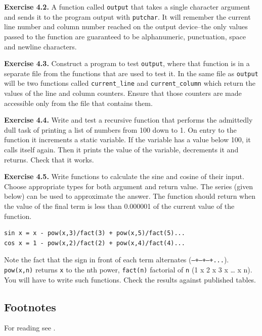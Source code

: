   \textbf{Exercise 4.2.} A function called \texttt{output} that takes a
   single character argument and sends it to the program output with
   \texttt{putchar}. It will remember the current line number and column
   number reached on the output device--the only values passed to the
   function are guaranteed to be alphanumeric, punctuation, space and
   newline characters.


  \textbf{Exercise 4.3.} Construct a program to test \texttt{output}, where
   that function is in a separate file from the functions that are used to
   test it. In the same file as \texttt{output} will be two functions
   called \texttt{current\_line} and \texttt{current\_column} which
   return the values of the line and column counters. Ensure that those
   counters are made accessible only from the file that contains
   them.


  \textbf{Exercise 4.4.} Write and test a recursive function that performs the
   admittedly dull task of printing a list of numbers from 100 down to 1. On
   entry to the function it increments a static variable. If the variable
   has a value below 100, it calls itself again. Then it prints the value of
   the variable, decrements it and returns. Check that it works.


  \textbf{Exercise 4.5.} Write functions to calculate the sine and cosine of their input.
    Choose appropriate types for both argument and return value. The series
    (given below) can be used to approximate the answer. The function should
    return when the value of the final term is less than 0.000001 of the
    current value of the function.

\begin{Verbatim}
sin x = x - pow(x,3)/fact(3) + pow(x,5)/fact(5)...
cos x = 1 - pow(x,2)/fact(2) + pow(x,4)/fact(4)...
\end{Verbatim}
Note the fact that the sign in front of each term alternates
    (\texttt{--+--+--+...}). \texttt{pow(x,n)} returns
    \texttt{x} to the nth power, \texttt{fact(n)}
    factorial of \texttt{n} (1 x 2 x 3 x \ldots 
    x n). You will have to write such functions. Check the
    results against published tables.

    \subsection{Footnotes}
    For reading see \cite{Stro}. 


